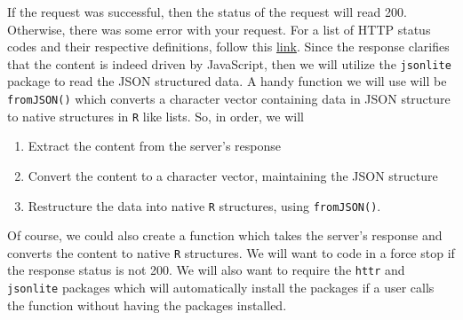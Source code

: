 \documentclass[
]{article}
\newenvironment{Shaded}{\begin{snugshade}}{\end{snugshade}}
\newcommand{\CommentTok}[1]{\textcolor[rgb]{0.56,0.35,0.01}{\textit{#1}}}
\newcommand{\ControlFlowTok}[1]{\textcolor[rgb]{0.13,0.29,0.53}{\textbf{#1}}}
\newcommand{\KeywordTok}[1]{\textcolor[rgb]{0.13,0.29,0.53}{\textbf{#1}}}
\newcommand{\NormalTok}[1]{#1}
\newcommand{\OperatorTok}[1]{\textcolor[rgb]{0.81,0.36,0.00}{\textbf{#1}}}
\newcommand{\StringTok}[1]{\textcolor[rgb]{0.31,0.60,0.02}{#1}}
\providecommand{\tightlist}{%
  \setlength{\itemsep}{0pt}\setlength{\parskip}{0pt}}
\begin{document}
If the request was successful, then the status of the request will read 200. Otherwise, there was some error with your request. For a list of HTTP status codes and their respective definitions, follow this \href{https://www.w3.org/Protocols/rfc2616/rfc2616-sec10.html}{link}. Since the response clarifies that the content is indeed driven by JavaScript, then we will utilize the \texttt{jsonlite} package to read the JSON structured data. A handy function we will use will be \texttt{fromJSON()} which converts a character vector containing data in JSON structure to native structures in \texttt{R} like lists. So, in order, we will

\begin{enumerate}
\def\labelenumi{\arabic{enumi}.}
\tightlist
\item
  Extract the content from the server's response
\item
  Convert the content to a character vector, maintaining the JSON structure
\item
  Restructure the data into native \texttt{R} structures, using \texttt{fromJSON()}.
\end{enumerate}

\begin{Shaded}
\end{Shaded}

Of course, we could also create a function which takes the server's response and converts the content to native \texttt{R} structures. We will want to code in a force stop if the response status is not 200. We will also want to require the \texttt{httr} and \texttt{jsonlite} packages which will automatically install the packages if a user calls the function without having the packages installed.

\begin{Shaded}
\end{Shaded}
\end{document}
